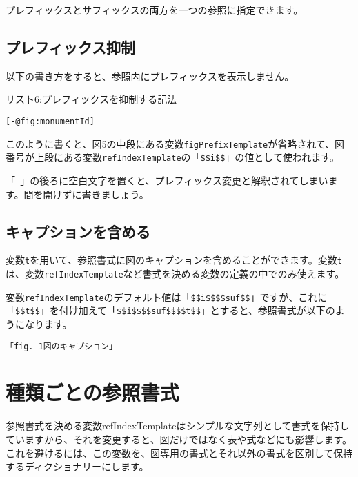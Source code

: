 プレフィックスとサフィックスの両方を一つの参照に指定できます。

\subsection{プレフィックス抑制}\label{ux30d7ux30ecux30d5ux30a3ux30c3ux30afux30b9ux6291ux5236}

以下の書き方をすると、参照内にプレフィックスを表示しません。

リスト6:プレフィックスを抑制する記法

\begin{verbatim}
[-@fig:monumentId]
\end{verbatim}

このように書くと、図5の中段にある変数\texttt{figPrefixTemplate}が省略されて、図番号が上段にある変数\texttt{refIndexTemplate}の「\texttt{\$\$i\$\$}」の値として使われます。

「\texttt{-}」の後ろに空白文字を置くと、プレフィックス変更と解釈されてしまいます。間を開けずに書きましょう。

\subsection{キャプションを含める}\label{ux30adux30e3ux30d7ux30b7ux30e7ux30f3ux3092ux542bux3081ux308b}

変数\texttt{t}を用いて、参照書式に図のキャプションを含めることができます。変数\texttt{t}は、変数\texttt{refIndexTemplate}など書式を決める変数の定義の中でのみ使えます。

変数\texttt{refIndexTemplate}のデフォルト値は「\texttt{\$\$i\$\$\$\$suf\$\$}」ですが、これに「\texttt{\$\$t\$\$}」を付け加えて「\texttt{\$\$i\$\$\$\$suf\$\$\$\$t\$\$}」とすると、参照書式が以下のようになります。

\begin{verbatim}
「fig. 1図のキャプション」
\end{verbatim}

\section{種類ごとの参照書式}\label{ux7a2eux985eux3054ux3068ux306eux53c2ux7167ux66f8ux5f0f}

参照書式を決める変数refIndexTemplateはシンプルな文字列として書式を保持していますから、それを変更すると、図だけではなく表や式などにも影響します。これを避けるには、この変数を、図専用の書式とそれ以外の書式を区別して保持するディクショナリーにします。


